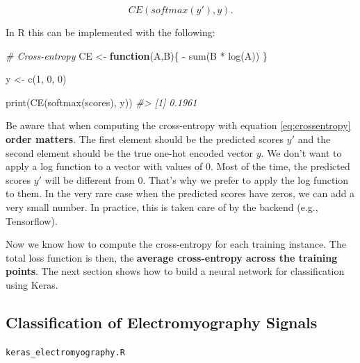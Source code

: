 \documentclass[
  11pt,
]{krantz}
\makeatletter
\newenvironment{Shaded}{\begin{snugshade}}{\end{snugshade}}
\newcommand{\CommentTok}[1]{\textcolor[rgb]{0.37,0.37,0.37}{\textit{#1}}}
\newcommand{\ControlFlowTok}[1]{\textcolor[rgb]{0.27,0.27,0.27}{\textbf{#1}}}
\newcommand{\DecValTok}[1]{\textcolor[rgb]{0.06,0.06,0.06}{#1}}
\newcommand{\FunctionTok}[1]{\textcolor[rgb]{0,0,0}{#1}}
\newcommand{\NormalTok}[1]{#1}
\newcommand{\OtherTok}[1]{\textcolor[rgb]{0.37,0.37,0.37}{#1}}
\newcommand{\SpecialCharTok}[1]{\textcolor[rgb]{0,0,0}{#1}}
\newenvironment{kframe}{%
\medskip{}
\setlength{\fboxsep}{.8em}
 \def\at@end@of@kframe{}%
 \ifinner\ifhmode%
  \def\at@end@of@kframe{\end{minipage}}%
  \begin{minipage}{\columnwidth}%
 \fi\fi%
 \def\FrameCommand##1{\hskip\@totalleftmargin \hskip-\fboxsep
 \colorbox{shadecolor}{##1}\hskip-\fboxsep
     \hskip-\linewidth \hskip-\@totalleftmargin \hskip\columnwidth}%
 \MakeFramed {\advance\hsize-\width
   \@totalleftmargin\z@ \linewidth\hsize
   \@setminipage}}%
 {\par\unskip\endMakeFramed%
 \at@end@of@kframe}
\newenvironment{rmdblock}[1]
  {
  \begin{itemize}
  \renewcommand{\labelitemi}{
    \raisebox{-.7\height}[0pt][0pt]{
      {\setkeys{Gin}{width=3em,keepaspectratio}\texttt{[image: images/icons/\#1]}}
    }
  }
  \setlength{\fboxsep}{1em}
  \begin{kframe}
  \item
  }
  {
  \end{kframe}
  \end{itemize}
  }
\newenvironment{rmdcaution}
  {\begin{rmdblock}{caution}}
  {\end{rmdblock}}
\newenvironment{rmdfolder}
  {\begin{rmdblock}{folder}}
  {\end{rmdblock}}
\makeatother
\begin{document}
\begin{equation}
  CE(softmax(y'),y).
\end{equation}

In R this can be implemented with the following:

\begin{Shaded}
\begin{Highlighting}[]
\CommentTok{\# Cross{-}entropy}
\NormalTok{CE }\OtherTok{\textless{}{-}} \ControlFlowTok{function}\NormalTok{(A,B)\{}
 \SpecialCharTok{{-}} \FunctionTok{sum}\NormalTok{(B }\SpecialCharTok{*} \FunctionTok{log}\NormalTok{(A))}
\NormalTok{\}}

\NormalTok{y }\OtherTok{\textless{}{-}} \FunctionTok{c}\NormalTok{(}\DecValTok{1}\NormalTok{, }\DecValTok{0}\NormalTok{, }\DecValTok{0}\NormalTok{)}

\FunctionTok{print}\NormalTok{(}\FunctionTok{CE}\NormalTok{(}\FunctionTok{softmax}\NormalTok{(scores), y))}
\CommentTok{\#\textgreater{} [1] 0.1961}
\end{Highlighting}
\end{Shaded}

\begin{rmdcaution}
Be aware that when computing the cross-entropy with equation \eqref{eq:crossentropy} \textbf{order matters}. The first element should be the predicted scores \(y'\) and the second element should be the true one-hot encoded vector \(y\). We don't want to apply a log function to a vector with values of \(0\). Most of the time, the predicted scores \(y'\) will be different from \(0\). That's why we prefer to apply the log function to them. In the very rare case when the predicted scores have zeros, we can add a very small number. In practice, this is taken care of by the backend (e.g., Tensorflow).
\end{rmdcaution}

Now we know how to compute the cross-entropy for each training instance. The total loss function is then, the \textbf{average cross-entropy across the training points}. The next section shows how to build a neural network for classification using Keras.

\hypertarget{classification-of-electromyography-signals}{%
\subsection{Classification of Electromyography Signals}\label{classification-of-electromyography-signals}}

\begin{rmdfolder}
\texttt{keras\_electromyography.R}
\end{rmdfolder}
\end{document}
